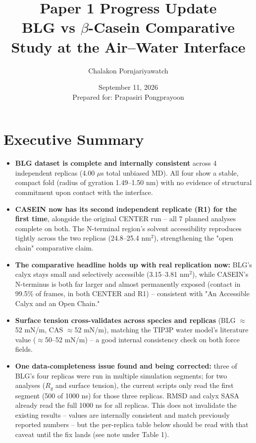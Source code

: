 \documentclass[11pt,a4paper]{article}
\title{\textbf{Paper 1 Progress Update} \\
\large BLG vs $\beta$-Casein Comparative Study at the Air--Water Interface}
\author{Chalakon Pornjariyawatch}
\date{September 11, 2026 \\ \small Prepared for: Prapasiri Pongprayoon}
\begin{document}
\maketitle

\section*{Executive Summary}
\begin{itemize}[leftmargin=1.5em]
  \item \textbf{BLG dataset is complete and internally consistent} across 4 independent
  replicas (4.00 $\mu$s total unbiased MD). All four show a stable, compact fold
  (radius of gyration 1.49--1.50 nm) with no evidence of structural commitment upon
  contact with the interface.
  \item \textbf{CASEIN now has its second independent replicate (R1) for the first time},
  alongside the original CENTER run -- all 7 planned analyses complete on both. The
  N-terminal region's solvent accessibility reproduces tightly across the two replicas
  (24.8--25.4 nm$^2$), strengthening the "open chain" comparative claim.
  \item \textbf{The comparative headline holds up with real replication now:} BLG's calyx
  stays small and selectively accessible (3.15--3.81 nm$^2$), while CASEIN's N-terminus is
  both far larger and almost permanently exposed (contact in 99.5\% of frames, in both
  CENTER and R1) -- consistent with "An Accessible Calyx and an Open Chain."
  \item \textbf{Surface tension cross-validates across species and replicas} (BLG
  $\approx$52 mN/m, CAS $\approx$52 mN/m), matching the TIP3P water model's literature
  value ($\approx$50--52 mN/m) -- a good internal consistency check on both force fields.
  \item \textbf{One data-completeness issue found and being corrected:} three of BLG's four
  replicas were run in multiple simulation segments; for two analyses ($R_g$ and surface
  tension), the current scripts only read the first segment (500 of 1000 ns) for those
  three replicas. RMSD and calyx SASA already read the full 1000 ns for all replicas.
  This does not invalidate the existing results -- values are internally consistent and match previously reported
  numbers -- but the per-replica table below should be read with that caveat until the fix
  lands (see note under Table 1).
\end{itemize}
\end{document}
